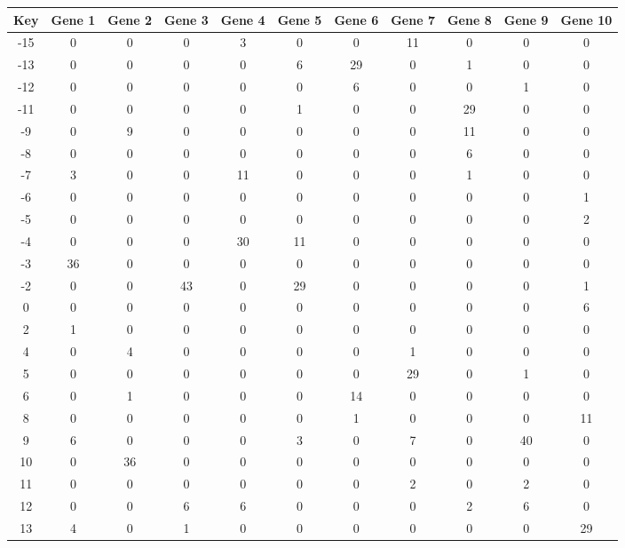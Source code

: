 \begin{tabular}{|c|c|c|c|c|c|c|c|c|c|c|}
\hline
Key & Gene 1 & Gene 2 & Gene 3 & Gene 4 & Gene 5 & Gene 6 & Gene 7 & Gene 8 & Gene 9 & Gene 10 \\
\hline
-15 & 0 & 0 & 0 & 3 & 0 & 0 & 11 & 0 & 0 & 0 \\
-13 & 0 & 0 & 0 & 0 & 6 & 29 & 0 & 1 & 0 & 0 \\
-12 & 0 & 0 & 0 & 0 & 0 & 6 & 0 & 0 & 1 & 0 \\
-11 & 0 & 0 & 0 & 0 & 1 & 0 & 0 & 29 & 0 & 0 \\
-9 & 0 & 9 & 0 & 0 & 0 & 0 & 0 & 11 & 0 & 0 \\
-8 & 0 & 0 & 0 & 0 & 0 & 0 & 0 & 6 & 0 & 0 \\
-7 & 3 & 0 & 0 & 11 & 0 & 0 & 0 & 1 & 0 & 0 \\
-6 & 0 & 0 & 0 & 0 & 0 & 0 & 0 & 0 & 0 & 1 \\
-5 & 0 & 0 & 0 & 0 & 0 & 0 & 0 & 0 & 0 & 2 \\
-4 & 0 & 0 & 0 & 30 & 11 & 0 & 0 & 0 & 0 & 0 \\
-3 & 36 & 0 & 0 & 0 & 0 & 0 & 0 & 0 & 0 & 0 \\
-2 & 0 & 0 & 43 & 0 & 29 & 0 & 0 & 0 & 0 & 1 \\
0 & 0 & 0 & 0 & 0 & 0 & 0 & 0 & 0 & 0 & 6 \\
2 & 1 & 0 & 0 & 0 & 0 & 0 & 0 & 0 & 0 & 0 \\
4 & 0 & 4 & 0 & 0 & 0 & 0 & 1 & 0 & 0 & 0 \\
5 & 0 & 0 & 0 & 0 & 0 & 0 & 29 & 0 & 1 & 0 \\
6 & 0 & 1 & 0 & 0 & 0 & 14 & 0 & 0 & 0 & 0 \\
8 & 0 & 0 & 0 & 0 & 0 & 1 & 0 & 0 & 0 & 11 \\
9 & 6 & 0 & 0 & 0 & 3 & 0 & 7 & 0 & 40 & 0 \\
10 & 0 & 36 & 0 & 0 & 0 & 0 & 0 & 0 & 0 & 0 \\
11 & 0 & 0 & 0 & 0 & 0 & 0 & 2 & 0 & 2 & 0 \\
12 & 0 & 0 & 6 & 6 & 0 & 0 & 0 & 2 & 6 & 0 \\
13 & 4 & 0 & 1 & 0 & 0 & 0 & 0 & 0 & 0 & 29 \\
\hline
\end{tabular}